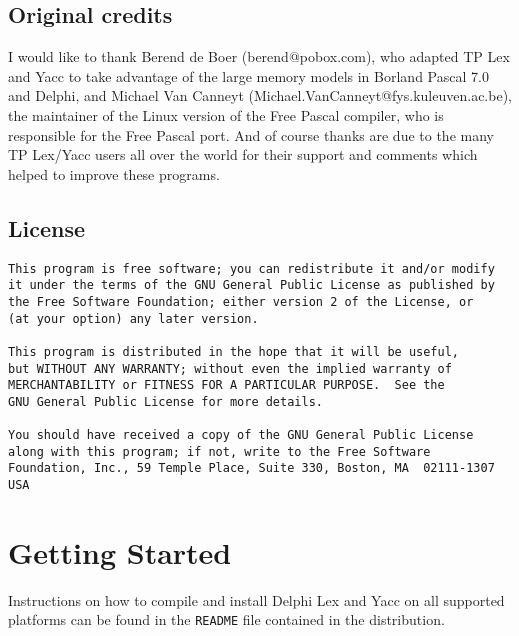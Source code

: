 \documentclass[a4paper]{article}
\begin{document}
\subsection{Original credits}

I would like to thank Berend de Boer (berend@pobox.com), who adapted TP Lex
and Yacc to take advantage of the large memory models in Borland Pascal 7.0
and Delphi, and Michael Van Canneyt (Michael.VanCanneyt@fys.kuleuven.ac.be),
the maintainer of the Linux version of the Free Pascal compiler, who is
responsible for the Free Pascal port. And of course thanks are due to the many
TP Lex/Yacc users all over the world for their support and comments which
helped to improve these programs.

\subsection{License}
\begin{verbatim}
This program is free software; you can redistribute it and/or modify
it under the terms of the GNU General Public License as published by
the Free Software Foundation; either version 2 of the License, or
(at your option) any later version.

This program is distributed in the hope that it will be useful,
but WITHOUT ANY WARRANTY; without even the implied warranty of
MERCHANTABILITY or FITNESS FOR A PARTICULAR PURPOSE.  See the
GNU General Public License for more details.

You should have received a copy of the GNU General Public License
along with this program; if not, write to the Free Software
Foundation, Inc., 59 Temple Place, Suite 330, Boston, MA  02111-1307  USA
\end{verbatim}

\newpage

\section{Getting Started}

Instructions on how to compile and install Delphi Lex and Yacc on all supported
platforms can be found in the \verb"README" file contained in the
distribution.
\end{document}
